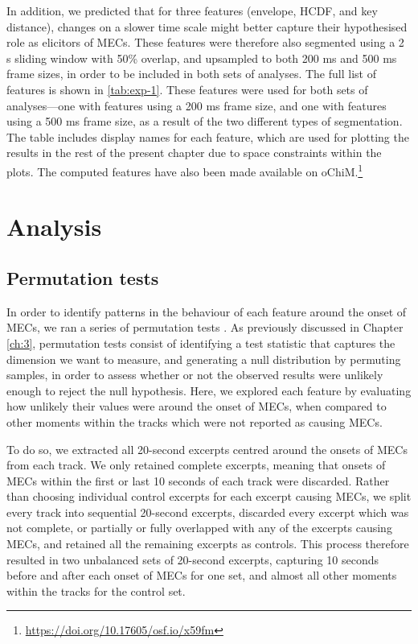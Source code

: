 In addition, we predicted that for three features (envelope, HCDF, and key distance), changes on a slower time scale might better capture their hypothesised role as elicitors of MECs. These features were therefore also segmented using a 2 s sliding window with 50\% overlap, and upsampled to both 200 ms and 500 ms frame sizes, in order to be included in both sets of analyses. The full list of features is shown in \autoref{tab:exp-1}. These features were used for both sets of analyses---one with features using a 200 ms frame size, and one with features using a 500 ms frame size, as a result of the two different types of segmentation. The table includes display names for each feature, which are used for plotting the results in the rest of the present chapter due to space constraints within the plots. The computed features have also been made available on oChiM.\footnote{\url{https://doi.org/10.17605/osf.io/x59fm}}



\section{Analysis}

\subsection{Permutation tests}

In order to identify patterns in the behaviour of each feature around the onset of MECs, we ran a series of permutation tests \parencite[for a similar approach, see][]{grewe2009b}. As previously discussed in Chapter \ref{ch:3}, permutation tests consist of identifying a test statistic that captures the dimension we want to measure, and generating a null distribution by permuting samples, in order to assess whether or not the observed results were unlikely enough to reject the null hypothesis. Here, we explored each feature by evaluating how unlikely their values were around the onset of MECs, when compared to other moments within the tracks which were not reported as causing MECs.

To do so, we extracted all 20-second excerpts centred around the onsets of MECs from each track. We only retained complete excerpts, meaning that onsets of MECs within the first or last 10 seconds of each track were discarded. Rather than choosing individual control excerpts for each excerpt causing MECs, we split every track into sequential 20-second excerpts, discarded every excerpt which was not complete, or partially or fully overlapped with any of the excerpts causing MECs, and retained all the remaining excerpts as controls. This process therefore resulted in two unbalanced sets of 20-second excerpts, capturing 10 seconds before and after each onset of MECs for one set, and almost all other moments within the tracks for the control set.

